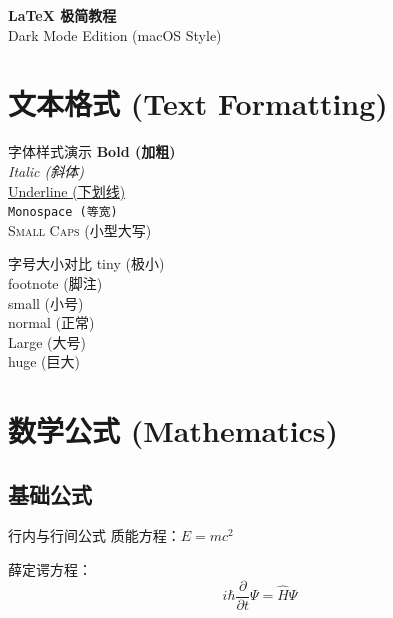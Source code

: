 \documentclass[UTF8]{ctexart}
\begin{document}
	
	\begin{center}
		{\Huge \bfseries LaTeX 极简教程} \\
		\vspace{0.3cm}
		{\large Dark Mode Edition (macOS Style)}
	\end{center}
	
	\tableofcontents
	\newpage
	
	\section{文本格式 (Text Formatting)}
	
	\begin{code-left}{字体样式演示}
		\textbf{Bold (加粗)} \\
		\textit{Italic (斜体)} \\
		\underline{Underline (下划线)} \\
		\texttt{Monospace (等宽)} \\
		\textsc{Small Caps (小型大写)}
	\end{code-left}
	
	\begin{code-left}{字号大小对比}
		{\tiny tiny (极小)} \\
		{\footnotesize footnote (脚注)} \\
		{\small small (小号)} \\
		{\normalsize normal (正常)} \\
		{\Large Large (大号)} \\
		{\huge huge (巨大)}
	\end{code-left}
	
	\section{数学公式 (Mathematics)}
	
	\subsection{基础公式}
	
	\begin{code-left}{行内与行间公式}
		质能方程：$E = mc^2$
		
		薛定谔方程：
		\[
		i\hbar\frac{\partial}{\partial t}\Psi = \hat{H}\Psi
		\]
	\end{code-left}
	
\end{document}
